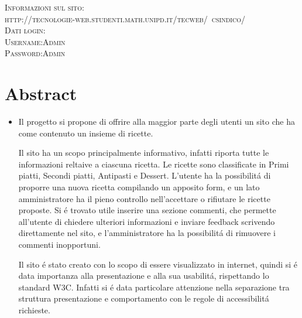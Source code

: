 \documentclass[12pt]{article}
\begin{document}
\begin{titlepage}
		
		\textsc{\Large Informazioni sul sito:}\\[0.3cm]	
		\textsc{http://tecnologie-web.studenti.math.unipd.it/tecweb/~csindico/}\\[1cm]
		
		
			\textsc{\Large Dati login:}\\[0.3cm]
			\textsc{ Username:Admin}\\[0.1mm]
			\textsc{ Password:Admin}\\[0.1mm]
			
		\vfill
	\end{titlepage}
	
	\newpage
	\renewcommand{\contentsname}{Indice}
	\tableofcontents
	
	
	\newpage
	
	\section{Abstract}
	\begin{itemize}
		\item Il progetto si propone di offrire  alla maggior parte degli utenti  un sito che ha come contenuto un insieme di ricette. 
			
		Il sito ha un scopo principalmente informativo, infatti riporta tutte le informazioni reltaive a ciascuna ricetta. Le ricette sono classificate in Primi piatti, Secondi piatti, Antipasti e Dessert. L'utente ha la possibilit\'a di proporre una nuova ricetta compilando un apposito form, e un lato amministratore ha il pieno controllo nell'accettare o rifiutare le ricette proposte. Si \'e trovato utile inserire una sezione commenti, che permette all'utente di chiedere ulteriori informazioni e inviare feedback scrivendo direttamente nel sito, e l'amministratore ha la possibilit\'a di rimuovere i commenti inopportuni.
		
		Il sito \'e stato creato con lo scopo di essere visualizzato in internet, quindi si \'e data importanza alla presentazione e alla sua usabilit\'a, rispettando lo standard W3C. Infatti si \'e data particolare attenzione nella separazione tra struttura presentazione e comportamento con le regole di accessibilit\'a richieste.
	\end{itemize}
\end{document}
